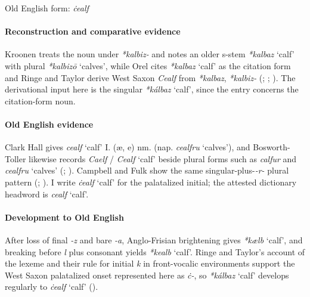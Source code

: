 \documentclass[
  british,
  a4paper,
]{article}
\providecommand{\Recon}[1]{\emph{*#1}}
\begin{document}
Old English form: \emph{ċealf}

\paragraph{Reconstruction and comparative
evidence}\label{reconstruction-and-comparative-evidence-11}

Kroonen treats the noun under \emph{*kalbiz-} and notes an older s-stem
\Recon{kalbaz} `calf' with plural \Recon{kalbizō} `calves', while Orel
cites \Recon{kalbaz} `calf' as the citation form and Ringe and Taylor
derive West Saxon \emph{Cealf} from \emph{*kalbaz}, \emph{*kalbiz-}
(; ; ).
The derivational input here is the singular \Recon{kálbaz} `calf', since
the entry concerns the citation-form noun.

\paragraph{Old English evidence}\label{old-english-evidence-11}

Clark Hall gives {\emph{cealf}} `calf' I. (æ, e) nm. (nap.
{\emph{cealfru}} `calves'), and Bosworth-Toller likewise records
\emph{Caelf} / \emph{Cealf} `calf' beside plural forms such as
\emph{calfur} and {\emph{cealfru}} `calves'
(;
).
Campbell and Fulk show the same singular-plus-\emph{-r-} plural pattern
(;
). I write \emph{ċealf} `calf'
for the palatalized initial; the attested dictionary headword is
{\emph{cealf}} `calf'.

\paragraph{Development to Old
English}\label{development-to-old-english-11}

After loss of final \emph{-z} and bare \emph{-a}, Anglo-Frisian
brightening gives \Recon{kælb} `calf', and breaking before \emph{l} plus
consonant yields \Recon{kealb} `calf'. Ringe and Taylor's account of the
lexeme and their rule for initial \emph{k} in front-vocalic environments
support the West Saxon palatalized onset represented here as \emph{ċ-},
so \Recon{kálbaz} `calf' develops regularly to \emph{ċealf} `calf'
().
\end{document}
